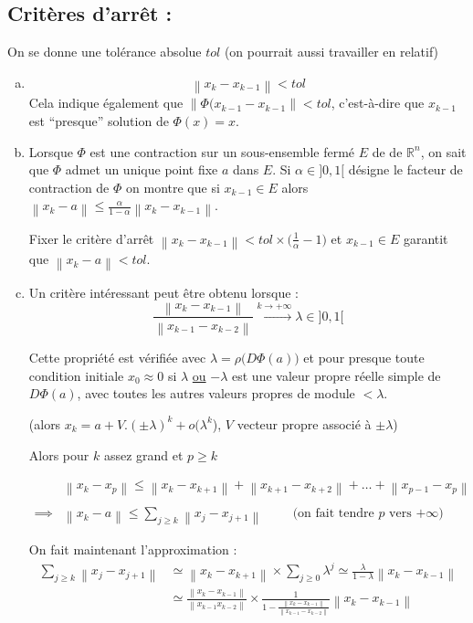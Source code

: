 \documentclass[a4paper,11pt]{article}
\newcommand{\R}{\mathbb{R}}
\newcommand{\norm}[1]{\left\lVert#1\right\rVert}
\theoremstyle{plain} %
\begin{document}
\subsection*{Critères d'arrêt :}
On se donne une tolérance absolue $tol$ (on pourrait aussi travailler en relatif)
\begin{enumerate}[a)]
    \item
        \[
              \norm{x_k - x_{k-1}} < tol
        \]
        Cela indique également que $\norm{\Phi(x_{k-1} - x_{k-1}} < tol$,
        c'est-à-dire que $x_{k-1}$ est ``presque'' solution de $\Phi(x) = x$.
        
    \item Lorsque $\Phi$ est une contraction sur un sous-ensemble fermé $E$ de
          de $\R^n$, on sait que $\Phi$ admet un unique point fixe $a$ dans $E$.
          Si $\alpha \in ]0,1[$ désigne le facteur de contraction de $\Phi$ on
          montre que si $x_{k-1} \in E$ alors $\norm{x_k-a} \leq \frac{\alpha}{1-\alpha} \norm{x_k - x_{k-1}}$.
          
          Fixer le critère d'arrêt $\norm{x_k - x_{k-1}} < tol \times \big(\frac{1}{\alpha} - 1 \big)$ et $x_{k-1} \in E$ garantit que $\norm{x_k - a} < tol$.


    \item Un critère intéressant peut être obtenu lorsque :
        \[
        \frac{\norm{x_k - x_{k-1}}}{\norm{x_{k-1}-x_{k-2}}} \xrightarrow{k\to+\infty} \lambda \in ]0,1[ 
        \]

        Cette propriété est vérifiée avec $\lambda = \rho \big(D\Phi(a) \big)$ et pour
        presque toute condition initiale $x_0 \approx 0$ si $\lambda$ \underline{ou} $-\lambda$
        est une valeur propre réelle simple de $D\Phi(a)$, avec toutes les autres
        valeurs propres de module $< \lambda$.

        (alors $x_k = a + V.(\pm \lambda)^k + o(\lambda^k$), $V$ vecteur propre
        associé à $\pm \lambda$)

        Alors pour $k$ assez grand et $p \geq k$

        \begin{align*}
            & \norm{x_k - x_p} \leq \norm{x_k - x_{k+1}} + \norm{x_{k+1} - x_{k+2}}
            + \dots + \norm{x_{p-1}-x_p} \\ 
            \\
            \implies & \norm{x_k - a} \leq \sum_{j \geq k} \norm{x_j - x_{j+1}} \hspace{1cm} \text{(on fait tendre $p$ vers $+\infty$)}
        \end{align*}
        
        On fait maintenant l'approximation :
        \begin{align*}
            \sum_{j \geq k} \norm{x_j - x_{j+1}} & \simeq \norm{x_k - x_{k+1}} \times \sum_{j \geq 0} \lambda ^j \simeq \frac{\lambda}{1 - \lambda} \norm{x_k - x_{k-1}} \\
            & \simeq \frac{\norm{x_k - x_{k-1}}}{\norm{x_{k-1}x_{k-2}}} \times \frac{1}{1-\frac{\norm{x_k - x_{k-1}}}{\norm{x_{k-1}-x_{k-2}}}} \norm{x_k - x_{k-1}}
        \end{align*}
\end{enumerate}
\end{document}
